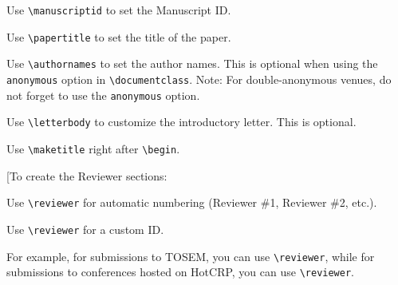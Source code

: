\documentclass[major, journal]{responseletter}
\begin{document}
\maketitle

{\color{red}

Use \texttt{\textbackslash{manuscriptid}} to set the Manuscript ID.

Use \texttt{\textbackslash{papertitle}} to set the title of the paper.

Use \texttt{\textbackslash{authornames}} to set the author names. This is optional when using the \texttt{anonymous} option in \texttt{\textbackslash{documentclass}}. Note: For double-anonymous venues, do not forget to use the \texttt{anonymous} option.

Use \texttt{\textbackslash{letterbody}} to customize the introductory letter. This is optional.

Use \texttt{\textbackslash{maketitle}} right after \texttt{\textbackslash{begin}}.

}


\metareview


\reviewer

\response[To create the Reviewer sections:

Use \texttt{\textbackslash{reviewer}} for automatic numbering (Reviewer \#1, Reviewer \#2, etc.).

Use \texttt{\textbackslash{reviewer}\string[<ID>\string]} for a custom ID.

For example, for submissions to TOSEM, you can use \texttt{\textbackslash{reviewer}}, while for submissions to conferences hosted on HotCRP, you can use \texttt{\textbackslash{reviewer}}.
\end{document}

